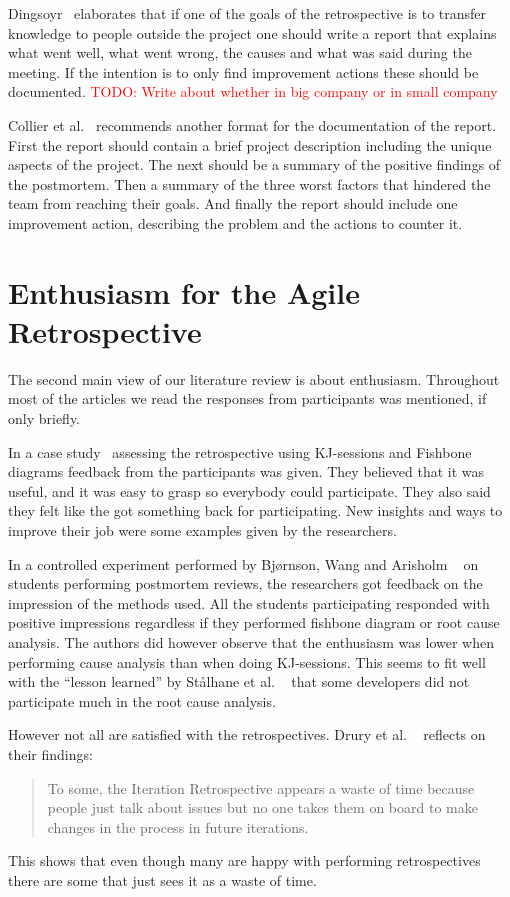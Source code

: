 \documentclass[12pt]{article}
\newcommand\todo[1]{\textcolor{red}{#1}}
\begin{document}
Dingsoyr~\cite{Dingsoyr2005} elaborates that if one of the goals of the retrospective is to transfer knowledge to people outside the project one should write a report that explains what went well, what went wrong, the causes and what was said during the meeting. If the intention is to only find improvement actions these should be documented. \todo{TODO: Write about whether in big company or in small company}

Collier et al.~\cite{Collier1996} recommends another format for the documentation of the report. First the report should contain a brief project description including the unique aspects of the project. The next should be a summary of the positive findings of the postmortem. Then a summary of the three worst factors that hindered the team from reaching their goals. And finally the report should include one improvement action, describing the problem and the actions to counter it. 

\section{Enthusiasm for the Agile Retrospective}
The second main view of our literature review is about enthusiasm. Throughout most of the articles we read the responses from participants was mentioned, if only briefly. 

In a case study~\cite{Hanssen2003} assessing the retrospective using KJ-sessions and Fishbone diagrams feedback from the participants was given. They believed that it was useful, and it was easy to grasp so everybody could participate. They also said they felt like the got something back for participating. New insights and ways to improve their job were some examples given by the researchers. 

In a controlled experiment performed by Bjørnson, Wang and Arisholm ~\cite{Bjornson2009} on students performing postmortem reviews, the researchers got feedback on the impression of the methods used. All the students participating responded with positive impressions regardless if they performed fishbone diagram or root cause analysis. The authors did however observe that the enthusiasm was lower when performing cause analysis than when doing KJ-sessions. This seems to fit well with the ``lesson learned'' by Stålhane et al. ~\cite{Hanssen2003}  that some developers did not participate much in the root cause analysis. 

However not all are satisfied with the retrospectives. Drury et al. ~\cite{Drury2012} reflects on their findings: 
\begin{quote}
To some, the Iteration Retrospective appears a waste of time because people just talk about issues but no one takes them on board to make changes in the process in future iterations.
\end{quote}
This shows that even though many are happy with performing retrospectives there are some that just sees it as a waste of time. 
\end{document}

